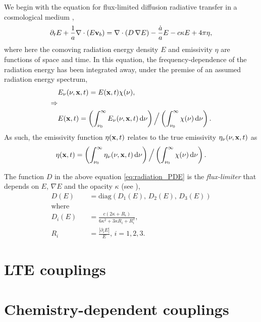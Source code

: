 \documentclass[letterpaper,10pt]{article}
\renewcommand{\(}{\left(}
\renewcommand{\)}{\right)}
\newcommand{\vb}{{\bf v}_b}
\newcommand{\xvec}{{\bf x}}
\begin{document}
We begin with the equation for flux-limited diffusion radiative
transfer in a cosmological medium \cite{ReynoldsHayesPaschosNorman2009},
\begin{equation}
\label{eq:radiation_PDE}
  \partial_{t} E + \frac1a \nabla\cdot\(E\vb\) =
    \nabla\cdot\(D\,\nabla E\) - \frac{\dot{a}}{a} E - c\kappa E + 4\pi\eta,
\end{equation}
where here the comoving radiation energy density $E$ and emissivity
$\eta$ are functions of space and time.  In this equation, the
frequency-dependence of the radiation energy has been integrated away,
under the premise of an assumed radiation energy spectrum,
\begin{align}
\label{eq:spectrum}
  & E_{\nu}(\nu,\xvec,t) = E(\xvec,t) \chi(\nu), \\
  \Rightarrow & \\
  & E(\xvec,t) = \(\int_{\nu_0}^{\infty} E_{\nu}(\nu,\xvec,t)\,\mathrm{d}\nu \)
    \Big/ \( \int_{\nu_0}^{\infty} \chi(\nu)\,\mathrm{d}\nu \).
\end{align}
As such, the emissivity function $\eta(\xvec,t)$
relates to the true emissivity $\eta_{\nu}(\nu,\xvec,t)$ as
\begin{equation}
\label{eq:emissivity}
  \eta(\xvec,t) = \( \int_{\nu_0}^{\infty}\eta_{\nu}(\nu,\xvec,t)\,\mathrm{d}\nu \) 
  \Big/ \( \int_{\nu_0}^{\infty}\chi(\nu)\,\mathrm{d}\nu \).
\end{equation}

The function $D$ in the above equation \eqref{eq:radiation_PDE} is
the {\em flux-limiter} that depends on $E$, $\nabla E$ and the 
opacity $\kappa$ (see
\cite{HayesNorman2003,ReynoldsHayesPaschosNorman2009}),  
\begin{equation}
\label{eq:limiter}
\begin{split}
   D(E) &= \text{diag}\( D_1(E),\, D_2(E),\, D_3(E) \) \\
   \text{where}\qquad & \\
   D_i(E) &= \frac{c(2\kappa+R_i)}{6\kappa^2+3\kappa R_i+R_i^2}, \\
   R_i &= \frac{|\partial_i E|}{E},\, i=1,2,3.
\end{split}
\end{equation}


\section{LTE couplings}
\label{sec:lte_model}


\section{Chemistry-dependent couplings}
\label{sec:chem_model}
\end{document}
